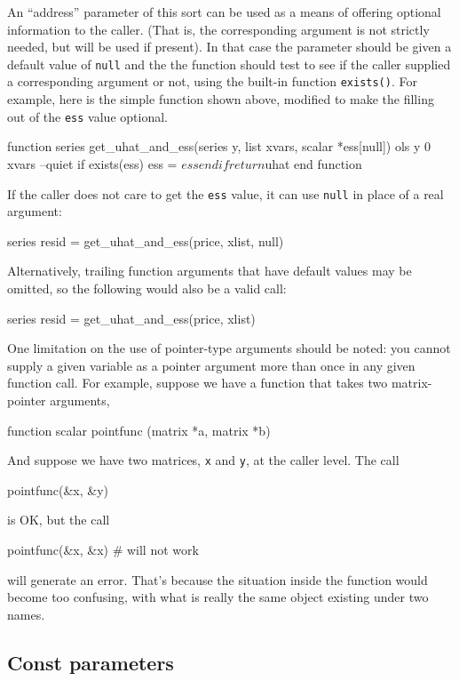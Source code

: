 An ``address'' parameter of this sort can be used as a means of
offering optional information to the caller.  (That is, the
corresponding argument is not strictly needed, but will be used if
present).  In that case the parameter should be given a default value
of \texttt{null} and the the function should test to see if the caller
supplied a corresponding argument or not, using the built-in function
\texttt{exists()}.  For example, here is the simple function shown
above, modified to make the filling out of the \texttt{ess} value
optional.
%
\begin{code}
function series get_uhat_and_ess(series y, list xvars, scalar *ess[null])
  ols y 0 xvars --quiet
  if exists(ess) 
     ess = $ess
  endif
  return $uhat
end function
\end{code}
%
If the caller does not care to get the \texttt{ess} value, it can
use \texttt{null} in place of a real argument:
%
\begin{code}
series resid = get_uhat_and_ess(price, xlist, null)
\end{code}
%
Alternatively, trailing function arguments that have default values 
may be omitted, so the following would also be a valid call:
%
\begin{code}
series resid = get_uhat_and_ess(price, xlist)
\end{code}

One limitation on the use of pointer-type arguments should be noted:
you cannot supply a given variable as a pointer argument more than
once in any given function call. For example, suppose we have a
function that takes two matrix-pointer arguments,
\begin{code}
function scalar pointfunc (matrix *a, matrix *b)
\end{code}
And suppose we have two matrices, \texttt{x} and \texttt{y}, at the
caller level.  The call
\begin{code}
pointfunc(&x, &y)
\end{code}
is OK, but the call
\begin{code}
pointfunc(&x, &x) # will not work
\end{code}
will generate an error. That's because the situation inside the
function would become too confusing, with what is really the same
object existing under two names.

\subsection{Const parameters}
\label{sec:const-args}


